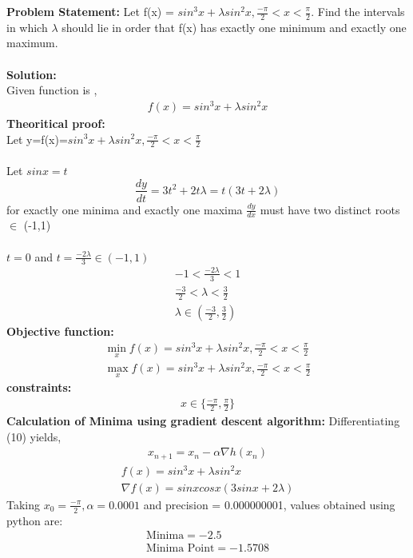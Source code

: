 \documentclass[10pt,a4paper]{report}
\begin{document}
\begin{multicols}{2}
\textbf{Problem Statement:}\vspace{2mm}
\justify Let f(x) = $sin^3 x+\lambda sin^2 x, \frac{-\pi}{2} < x < \frac{\pi}{2} $. Find the intervals in which $\lambda$ should lie in order that f(x) has exactly one minimum and exactly one maximum.
\\
\\
\vspace{4mm}
\textbf{Solution:}
\\
Given function is ,
	\begin{align}
	f(x)= sin^3 x+\lambda sin^2 x
	\end{align}
	\textbf{Theoritical proof:}
\vspace{4mm}
\\
Let y=f(x)=$sin^3 x+\lambda sin^2 x, \frac{-\pi}{2} < x < \frac{\pi}{2} $\\ \\
Let $sinx=t$
    \begin{equation}
	 \frac{dy}{dt}=3t^2+2t\lambda=t(3t+2\lambda)
	 \end{equation}
	 for exactly one minima and exactly one maxima  $\frac{dy}{dx} $ must have two distinct roots $\in$ (-1,1) \\ \\
	 \hspace*{2.2cm}$t=0$ and $t=\frac{-2\lambda}{3}\in (-1,1)$\\
	 \begin{align}
	 -1<\frac{-2\lambda}{3}<1\\
	 \frac{-3}{2}<\lambda<\frac{3}{2}\\
	 \lambda\in (\frac{-3}{2},\frac{3}{2})
	 \end{align}
	\textbf{Objective function:}
	\begin{align}
	\min_xf(x)= sin^3 x+\lambda sin^2 x, \frac{-\pi}{2} < x < \frac{\pi}{2} \\
	\max_xf(x)= sin^3 x+\lambda sin^2 x, \frac{-\pi}{2} < x < \frac{\pi}{2} 
        \end{align}
	\textbf{constraints:}\\
	\begin{align}
		x \in \{ \frac{-\pi}{2}, \frac{\pi}{2}\} 
	\end{align}
\textbf{Calculation of Minima using gradient descent algorithm:}
Differentiating (10) yields,
\begin{align}
       \boxed{x_{n+1} = x_n - \alpha \nabla h(x_n)} 
\end{align}
\begin{align}
f(x)= sin^3 x+\lambda sin^2 x \\ 
\nabla f(x) = sinx cosx (3sinx+2\lambda)
\end{align}
\vspace{1mm}
Taking $x_0=\frac{-\pi}{2},\alpha=0.0001$ and precision = 0.000000001, values obtained using python are:
    \begin{align}
        \boxed{\text{Minima} =-2.5}\\     
        \boxed{\text{Minima Point} = -1.5708}
    \end{align}
   

\end{multicols}
\end{document}
